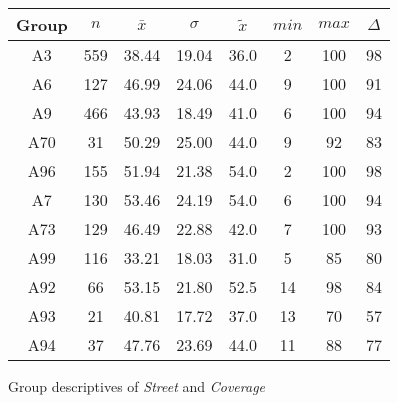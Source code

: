 \begin{figure}[ht!]
	\centering
	\begin{minipage}{0.5\textwidth}
		\tiny
		\setlength{\tabcolsep}{4pt}
		\centering
		\begin{tabular}{c|c|c|c|c|c|c|c}
			\toprule
			Group & $n$ & $\bar{x}$ & $\sigma$ & $\tilde{x}$ & $min$ & $max$ & $\Delta$ \\
			\midrule
			A3  & 559 & 38.44 & 19.04 & 36.0 & 2  & 100 & 98 \\ 
			A6  & 127 & 46.99 & 24.06 & 44.0 & 9  & 100 & 91 \\ 
			A9  & 466 & 43.93 & 18.49 & 41.0 & 6  & 100 & 94 \\ 
			A70 & 31  & 50.29 & 25.00 & 44.0 & 9  & 92  & 83 \\ 
			A96 & 155 & 51.94 & 21.38 & 54.0 & 2  & 100 & 98 \\ 
			A7  & 130 & 53.46 & 24.19 & 54.0 & 6  & 100 & 94 \\ 
			A73 & 129 & 46.49 & 22.88 & 42.0 & 7  & 100 & 93 \\ 
			A99 & 116 & 33.21 & 18.03 & 31.0 & 5  & 85  & 80 \\ 
			A92 & 66  & 53.15 & 21.80 & 52.5 & 14 & 98  & 84 \\ 
			A93 & 21  & 40.81 & 17.72 & 37.0 & 13 & 70  & 57 \\ 
			A94 & 37  & 47.76 & 23.69 & 44.0 & 11 & 88  & 77 \\ 
			\bottomrule
		\end{tabular}
		\label{tbl:descriptives_baysis_matched_Str_Cov}
	\end{minipage}%
	\begin{minipage}{0.55\textwidth}
		\tiny
		\centering
		\vfill
		\label{fig:descriptives_baysis_matched_Str_Cov}
	\end{minipage}%
	\caption{Group descriptives of \textit{Street} and \textit{Coverage}}
\end{figure}
